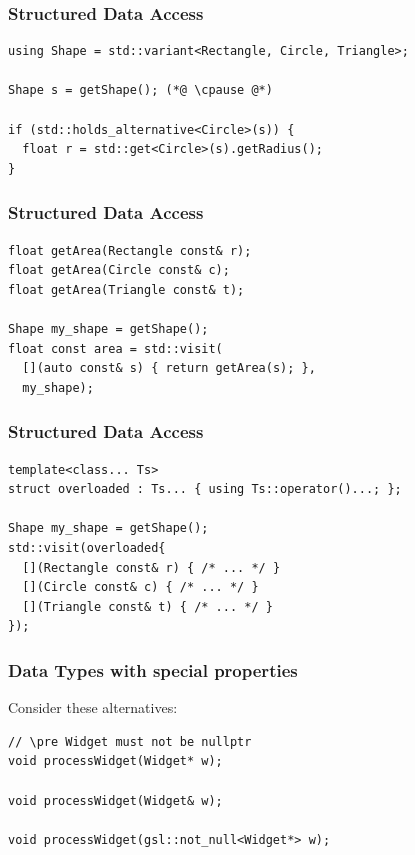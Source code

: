 \documentclass[aspectratio=169]{beamer}
\newif\iftransitions
\newcommand{\cpause}{\iftransitions \pause \fi}
\begin{document}
\begin{frame}[fragile]
  \frametitle{Structured Data Access}
  
  \begin{lstlisting}[style=cpp20]
using Shape = std::variant<Rectangle, Circle, Triangle>;

Shape s = getShape(); (*@ \cpause @*)

if (std::holds_alternative<Circle>(s)) {
  float r = std::get<Circle>(s).getRadius();
}
  \end{lstlisting}
  
\end{frame}

\begin{frame}[fragile]
  \frametitle{Structured Data Access}
  
  \begin{lstlisting}[style=cpp20]
float getArea(Rectangle const& r);
float getArea(Circle const& c);
float getArea(Triangle const& t);

Shape my_shape = getShape();
float const area = std::visit(
  [](auto const& s) { return getArea(s); },
  my_shape);
  \end{lstlisting}
\end{frame}

\begin{frame}[fragile]
  \frametitle{Structured Data Access}
  
  \begin{lstlisting}[style=cpp20]
template<class... Ts>
struct overloaded : Ts... { using Ts::operator()...; };

Shape my_shape = getShape();
std::visit(overloaded{
  [](Rectangle const& r) { /* ... */ }
  [](Circle const& c) { /* ... */ }
  [](Triangle const& t) { /* ... */ }
});
  \end{lstlisting}
\end{frame}

\iffalse
\begin{frame}[fragile]
  \frametitle{Data Types with special properties}

Consider these alternatives:

  \begin{lstlisting}[style=cpp20]
// \pre Widget must not be nullptr
void processWidget(Widget* w);

void processWidget(Widget& w);

void processWidget(gsl::not_null<Widget*> w);
  \end{lstlisting}
\end{frame}
\end{document}
